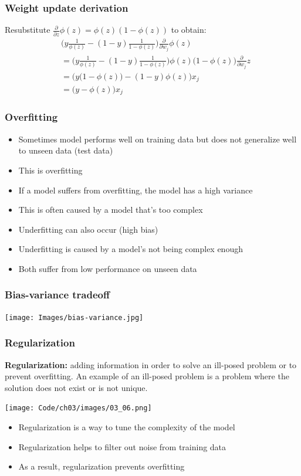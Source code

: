 \documentclass{beamer}
\begin{document}
\begin{frame}
  \frametitle{Weight update derivation}
  Resubstitute $\frac{\partial}{\partial z} \phi(z) = \phi(z)(1-\phi(z))$ to obtain:
  \begin{equation*}
  \begin{split}
    & \Bigg( y \frac{1}{\phi(z)} - (1-y) \frac{1}{1-\phi(z)} \Bigg) \frac{\partial}{\partial w_j} \phi(z) \\
    & = \Bigg( y \frac{1}{\phi(z)} - (1-y) \frac{1}{1-\phi(z)} \Bigg) \phi(z) \big(1 - \phi(z)\big) \frac{\partial}{\partial w_j} z \\
    & = \bigg(  y \big( 1 - \phi(z)   \big) - (1-y) \phi(z)  \bigg) x_j \\
    & = \big( y - \phi(z)  \big) x_j
  \end{split}
  \end{equation*}
\end{frame}

\begin{frame}
  \frametitle{Overfitting}
  \begin{itemize}
  \item Sometimes model performs well on training data but does not generalize well to unseen data (test data)
  \item This is overfitting
  \item If a model suffers from overfitting, the model has a high variance
  \item This is often caused by a model that's too complex
  \item Underfitting can also occur (high bias)
  \item Underfitting is caused by a model's not being complex enough
  \item Both suffer from low performance on unseen data
  \end{itemize}
\end{frame}

\begin{frame}
  \frametitle{Bias-variance tradeoff}
  \texttt{[image: Images/bias-variance.jpg]}
\end{frame}

\begin{frame}
  \frametitle{Regularization}
  \textbf{Regularization:} adding information in order to solve an ill-posed problem or to prevent overfitting. An example of an ill-posed problem is a problem where the solution does not exist or is not unique.
  \begin{center}
  \texttt{[image: Code/ch03/images/03\_06.png]}
  \end{center}
  \begin{itemize}
  \item Regularization is a way to tune the complexity of the model
  \item Regularization helps to filter out noise from training data
  \item As a result, regularization prevents overfitting
  \end{itemize}
\end{frame}
\end{document}
